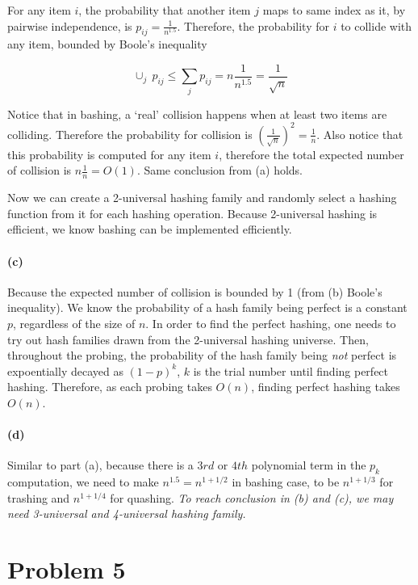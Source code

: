 \documentclass[12pt]{article}
\begin{document}
For any item $i$, the probability that another item $j$ maps to same index as it, by pairwise independence, is $p_{ij} = \frac{1}{n^{1.5}}$. Therefore, the probability for $i$ to collide with any item, bounded by Boole's inequality 

$$ \cup_j\: p_{ij} \leq \sum_j p_{ij} = n \frac{1}{ n^{1.5}} = \frac{1}{ \sqrt{n}}$$

Notice that in bashing, a `real' collision happens when at least two items are colliding. Therefore the probability for collision is $(\frac{1}{ \sqrt{n}})^2 = \frac{1}{n}$. Also notice that this probability is computed for any item $i$, therefore the total expected number of collision is $n \frac{1}{n} = O(1)$. Same conclusion from (a) holds.

Now we can create a 2-universal hashing family and randomly select a hashing function from it for each hashing operation. Because 2-universal hashing is efficient, we know bashing can be implemented efficiently.

\paragraph{(c)} Because the expected number of collision is bounded by 1 (from (b) Boole's inequality). We know the probability of a hash family being perfect is a constant $p$, regardless of the size of $n$. In order to find the perfect hashing, one needs to try out hash families drawn from the 2-universal hashing universe. Then, throughout the probing, the probability of the hash family being \emph{not} perfect is expoentially decayed as $(1-p)^k$, $k$ is the trial number until finding perfect hashing. Therefore, as each probing takes $O(n)$, finding perfect hashing takes $O(n)$.

\paragraph{(d)} 

Similar to part (a), because there is a $3rd$ or $4th$ polynomial term in the $p_k$ computation, we need to make $n^{1.5} = n^{1 + 1/2}$ in bashing case, to be $n^{1 + 1/3}$ for trashing and $n^{1 + 1/4}$ for quashing. \emph{To reach conclusion in (b) and (c), we may need 3-universal and 4-universal hashing family.}

\pagebreak

\section*{Problem 5}
\end{document}
